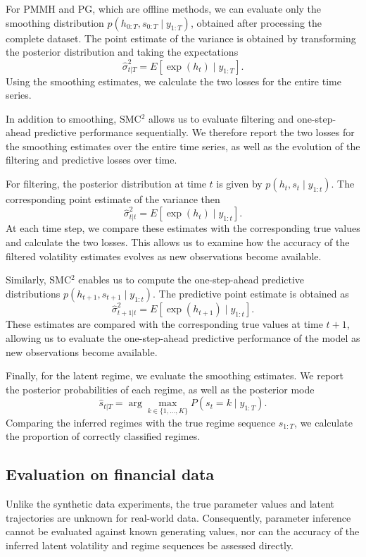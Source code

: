 For PMMH and PG, which are offline methods, we can evaluate only the smoothing distribution
$p(h_{0:T},s_{0:T}\mid y_{1:T})$, obtained after processing the complete dataset. The point estimate of the variance is obtained by transforming the posterior distribution and taking the expectations
\[
    \hat{\sigma}_{t|T}^2 = E[\exp(h_t)\mid y_{1:T}].
\]
Using the smoothing estimates, we calculate the two losses for the entire time series.

In addition to smoothing, SMC$^2$ allows us to evaluate filtering and one-step-ahead predictive performance sequentially. We therefore report the two losses for the smoothing estimates over the entire time series, as well as the evolution of the filtering and predictive losses over time.

For filtering, the posterior distribution at time $t$ is given by
$p(h_t,s_t\mid y_{1:t})$. The corresponding point estimate of the variance then
\[
    \hat{\sigma}_{t|t}^2 = E[\exp(h_t)\mid y_{1:t}].
\]
At each time step, we compare these estimates with the corresponding true values and calculate the two losses. This allows us to examine how the accuracy of the filtered volatility estimates evolves as new observations become available.

Similarly, SMC$^2$ enables us to compute the one-step-ahead predictive distributions
$p(h_{t+1},s_{t+1}\mid y_{1:t})$. The predictive point estimate is obtained as
\[
    \hat{\sigma}_{t+1|t}^2 = E[\exp(h_{t+1})\mid y_{1:t}].
\]
These estimates are compared with the corresponding true values at time $t+1$, allowing us to evaluate the one-step-ahead predictive performance of the model as new observations become available.

Finally, for the latent regime, we evaluate the smoothing estimates. We report the posterior probabilities of each regime, as well as the posterior mode
\[
    \hat{s}_{t|T}
    =
    \arg\max_{k\in\{1,\ldots,K\}}
    P(s_t=k\mid y_{1:T}).
\]
Comparing the inferred regimes with the true regime sequence $s_{1:T}$, we calculate the proportion of correctly classified regimes.

\subsection{Evaluation on financial data}

Unlike the synthetic data experiments, the true parameter values and latent trajectories are unknown for real-world data. Consequently, parameter inference cannot be evaluated against known generating values, nor can the accuracy of the inferred latent volatility and regime sequences be assessed directly.

